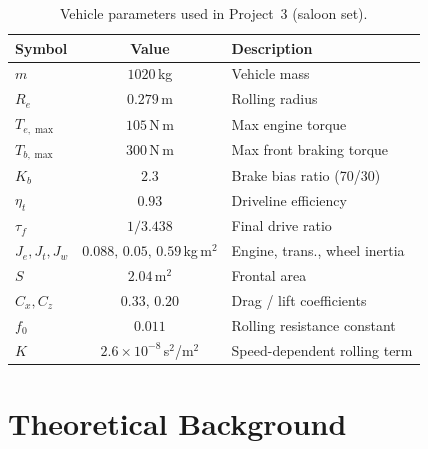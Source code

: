 \begin{table}[H]
    \centering
    \begin{tabular}{lcl}
        \toprule
        \textbf{Symbol} & \textbf{Value} & \textbf{Description} \\
        \midrule
        $m$         & $1020$\,kg               & Vehicle mass \\
        $R_e$       & $0.279$\,m               & Rolling radius \\
        $T_{e,\max}$& $105$\,N\,m              & Max engine torque \\
        $T_{b,\max}$& $300$\,N\,m              & Max front braking torque \\
        $K_b$       & $2.3$                    & Brake bias ratio (70/30) \\
        $\eta_t$    & $0.93$                   & Driveline efficiency \\
        $\tau_f$    & $1/3.438$                & Final drive ratio \\
        $J_e,J_t,J_w$&$0.088,\,0.05,\,0.59$\,kg\,m$^2$ & Engine, trans., wheel inertia \\
        $S$         & $2.04$\,m$^2$            & Frontal area \\
        $C_x,C_z$   & $0.33,\,0.20$            & Drag / lift coefficients \\
        $f_0$       & $0.011$                  & Rolling resistance constant \\
        $K$         & $2.6\!\times\!10^{-8}$\,s$^2$/m$^2$ & Speed-dependent rolling term \\
        \bottomrule
    \end{tabular}
    \caption{Vehicle parameters used in Project~3 (saloon set).}
    \label{tab:params_p3}
\end{table}

\section{Theoretical Background}
\label{sec:theory_p3}


